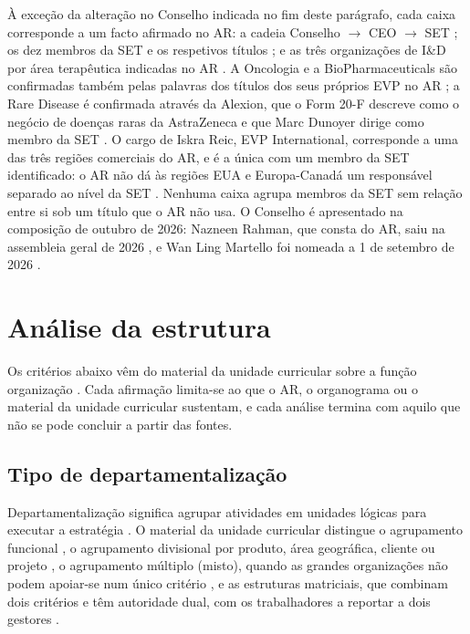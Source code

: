 À exceção da alteração no Conselho indicada no fim deste parágrafo, cada caixa corresponde a um facto afirmado no AR: a cadeia Conselho $\rightarrow$ CEO $\rightarrow$ SET \cite[pp.~67, 70]{AR}; os dez membros da SET e os respetivos títulos \cite[p.~70]{AR}; e as três organizações de I\&D por área terapêutica indicadas no AR \cite[p.~26]{AR}. A Oncologia e a BioPharmaceuticals são confirmadas também pelas palavras dos títulos dos seus próprios EVP no AR \cite[p.~70]{AR}; a Rare Disease é confirmada através da Alexion, que o Form 20-F descreve como o negócio de doenças raras da AstraZeneca \cite[Item~4.A]{F20} e que Marc Dunoyer dirige como membro da SET \cite[p.~70]{AR}. O cargo de Iskra Reic, EVP International, corresponde a uma das três regiões comerciais do AR, e é a única com um membro da SET identificado: o AR não dá às regiões EUA e Europa-Canadá um responsável separado ao nível da SET \cite[pp.~32, 70]{AR}. Nenhuma caixa agrupa membros da SET sem relação entre si sob um título que o AR não usa. O Conselho é apresentado na composição de outubro de 2026: Nazneen Rahman, que consta do AR, saiu na assembleia geral de 2026 \cite{AGM26}, e Wan Ling Martello foi nomeada a 1 de setembro de 2026 \cite{MART}.

\section{Análise da estrutura}

Os critérios abaixo vêm do material da unidade curricular sobre a função organização \cite{ORG}. Cada afirmação limita-se ao que o AR, o organograma ou o material da unidade curricular sustentam, e cada análise termina com aquilo que não se pode concluir a partir das fontes.

\subsection{Tipo de departamentalização}

Departamentalização significa agrupar atividades em unidades lógicas para executar a estratégia \cite[p.~14]{ORG}. O material da unidade curricular distingue o agrupamento funcional \cite[p.~15]{ORG}, o agrupamento divisional por produto, área geográfica, cliente ou projeto \cite[pp.~16--19]{ORG}, o agrupamento múltiplo (misto), quando as grandes organizações não podem apoiar-se num único critério \cite[p.~20]{ORG}, e as estruturas matriciais, que combinam dois critérios e têm autoridade dual, com os trabalhadores a reportar a dois gestores \cite[pp.~21--22]{ORG}.

